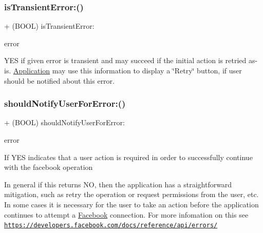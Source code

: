 \subsubsection{\texorpdfstring{is\+Transient\+Error\+:()}{isTransientError:()}\hspace{0.1cm}{\footnotesize\ttfamily [5/5]}}
{\footnotesize\ttfamily + (B\+O\+OL) is\+Transient\+Error\+: \begin{DoxyParamCaption}\item[{(N\+S\+Error $\ast$)}]{error }\end{DoxyParamCaption}}

Y\+ES if given error is transient and may succeed if the initial action is retried as-\/is. \hyperlink{classApplication}{Application} may use this information to display a \char`\"{}\+Retry\char`\"{} button, if user should be notified about this error. \mbox{\label{interfaceFBErrorUtility_a1417132074a898433aa3a79ab6ebc7b6}} 
\subsubsection{\texorpdfstring{should\+Notify\+User\+For\+Error\+:()}{shouldNotifyUserForError:()}\hspace{0.1cm}{\footnotesize\ttfamily [1/5]}}
{\footnotesize\ttfamily + (B\+O\+OL) should\+Notify\+User\+For\+Error\+: \begin{DoxyParamCaption}\item[{(N\+S\+Error $\ast$)}]{error }\end{DoxyParamCaption}}

If Y\+ES indicates that a user action is required in order to successfully continue with the facebook operation

In general if this returns NO, then the application has a straightforward mitigation, such as retry the operation or request permissions from the user, etc. In some cases it is necessary for the user to take an action before the application continues to attempt a \hyperlink{interfaceFacebook}{Facebook} connection. For more infomation on this see \href{https://developers.facebook.com/docs/reference/api/errors/}{\tt https\+://developers.\+facebook.\+com/docs/reference/api/errors/}


